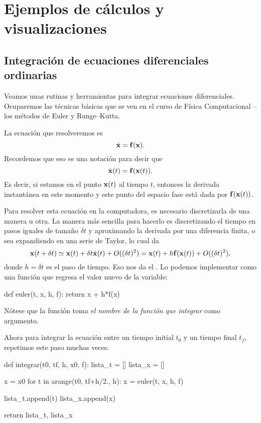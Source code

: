\chapter{Ejemplos de cálculos y visualizaciones}

\section{Integración de ecuaciones diferenciales ordinarias}

Veamos unas rutinas y herramientas para integrar ecuaciones diferenciales. Ocuparemos las técnicas básicas  que se ven en el curso de Física Computacional --los métodos de Euler y Runge--Kutta.

La ecuación que resolveremos es
\begin{equation}
\dot{\mathbf{x}} = \mathbf{f}(\mathbf{x}).
\end{equation}
Recordemos que eso es una notación para decir que
\begin{equation}
\dot{\mathbf{x}}(t) = \mathbf{f}(\mathbf{x}(t)).
\end{equation}
Es decir, si estamos en el punto $\mathbf{x}(t)$ al tiempo $t$, entonces la derivada instantánea en este momento y este punto del espacio fase está dada por $\mathbf{f}(\mathbf{x}(t))$.

Para resolver esta ecuación en la computadora, es necesario discretizarla de una manera u otra.
La manera más sencilla para hacerlo es discretizando el tiempo en pasos iguales de tamaño $\delta t$ y aproximando la derivada por una diferencia finita, o sea expandiendo en una serie de Taylor, lo cual da
\begin{equation}
 \mathbf{x}(t+\delta t) \simeq \mathbf{x}(t) + \delta t \dot{\mathbf{x}}(t) + O( (\delta t) ^2) = \mathbf{x}(t) + h \mathbf{f}(\mathbf{x}(t)) + O( (\delta t) ^2),
\end{equation}
donde $h = \delta t$ es el paso de tiempo.
Eso nos da el . Lo podemos implementar como una función que regresa el valor nuevo de la variable:
\begin{python}
def euler(t, x, h, f):
  return x + h*f(x)
\end{python}
Nótese que la función  toma \emph{el nombre de la función  que integrar} como argumento.

Ahora para integrar la ecuación entre un tiempo initial $t_0$ y un tiempo final $t_f$, repetimos este paso muchas veces:
\begin{python}
def integrar(t0, tf, h, x0, f):
  lista_t = []
  lista_x = []
  
  x = x0
  for t in arange(t0, tf+h/2., h):
    x = euler(t, x, h, f)
    
    lista_t.append(t)
    lista_x.append(x)
    
  return lista_t, lista_x
\end{python}




